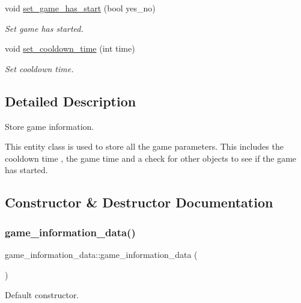 \begin{DoxyCompactItemize}
void \hyperlink{classgame__information__data_a4dbb7c0d6ba269942ba417c800c66c11}{set\+\_\+game\+\_\+has\+\_\+start} (bool yes\+\_\+no)
\begin{DoxyCompactList}\small\item\em Set game has started. \end{DoxyCompactList}\item 
void \hyperlink{classgame__information__data_ab690a619ee210b5660017d8a57ed630a}{set\+\_\+cooldown\+\_\+time} (int time)
\begin{DoxyCompactList}\small\item\em Set cooldown time. \end{DoxyCompactList}\end{DoxyCompactItemize}


\subsection{Detailed Description}
Store game information. 

This entity class is used to store all the game parameters. This includes the cooldown time , the game time and a check for other objects to see if the game has started. 

\subsection{Constructor \& Destructor Documentation}
\hypertarget{classgame__information__data_adf5e84fd74e3e18b71b4acdc74de6844}{}\label{classgame__information__data_adf5e84fd74e3e18b71b4acdc74de6844} 
\subsubsection{\texorpdfstring{game\+\_\+information\+\_\+data()}{game\_information\_data()}}
{\footnotesize\ttfamily game\+\_\+information\+\_\+data\+::game\+\_\+information\+\_\+data (\begin{DoxyParamCaption}{ }\end{DoxyParamCaption})\hspace{0.3cm}{\ttfamily [inline]}}



Default constructor. 


